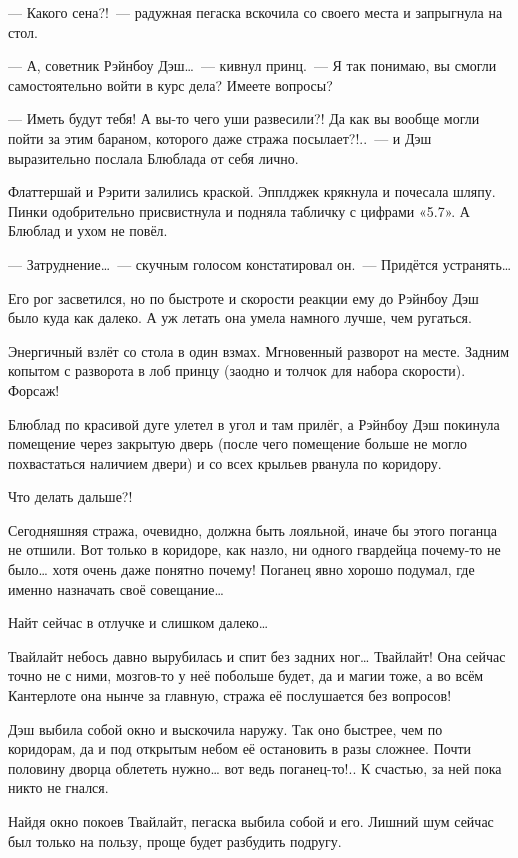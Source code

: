 \documentclass[twoside,a5paper,12pt]{extbook}
\begin{document}
— Какого сена?! — радужная пегаска вскочила со своего места и запрыгнула на стол.

— А, советник Рэйнбоу Дэш… — кивнул принц. — Я так понимаю, вы смогли самостоятельно войти в курс дела? Имеете вопросы?

— Иметь будут тебя! А вы-то чего уши развесили?! Да как вы вообще могли пойти за этим бараном, которого даже стража посылает?!.. — и Дэш выразительно послала Блюблада от себя лично.

Флаттершай и Рэрити залились краской. Эпплджек крякнула и почесала шляпу. Пинки одобрительно присвистнула и подняла табличку с цифрами «5.7». А Блюблад и ухом не повёл.

— Затруднение… — скучным голосом констатировал он. — Придётся устранять…

Его рог засветился, но по быстроте и скорости реакции ему до Рэйнбоу Дэш было куда как далеко. А уж летать она умела намного лучше, чем ругаться.

Энергичный взлёт со стола в один взмах. Мгновенный разворот на месте. Задним копытом с разворота в лоб принцу (заодно и толчок для набора скорости). Форсаж!

Блюблад по красивой дуге улетел в угол и там прилёг, а Рэйнбоу Дэш покинула помещение через закрытую дверь (после чего помещение больше не могло похвастаться наличием двери) и со всех крыльев рванула по коридору.

Что делать дальше?!

Сегодняшняя стража, очевидно, должна быть лояльной, иначе бы этого поганца не отшили. Вот только в коридоре, как назло, ни одного гвардейца почему-то не было… хотя очень даже понятно почему! Поганец явно хорошо подумал, где именно назначать своё совещание…

Найт сейчас в отлучке и слишком далеко…

Твайлайт небось давно вырубилась и спит без задних ног… Твайлайт! Она сейчас точно не с ними, мозгов-то у неё побольше будет, да и магии тоже, а во всём Кантерлоте она нынче за главную, стража её послушается без вопросов!

Дэш выбила собой окно и выскочила наружу. Так оно быстрее, чем по коридорам, да и под открытым небом её остановить в разы сложнее. Почти половину дворца облететь нужно… вот ведь поганец-то!.. К счастью, за ней пока никто не гнался.

Найдя окно покоев Твайлайт, пегаска выбила собой и его. Лишний шум сейчас был только на пользу, проще будет разбудить подругу.
\end{document}

